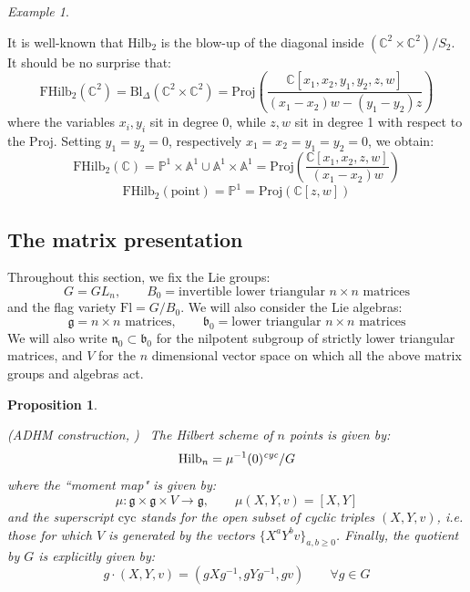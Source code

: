 \documentclass[12pt]{amsart}
\numberwithin{equation}{section}
\newtheorem{proposition}[theorem]{Proposition}
\theoremstyle{definition}
\theoremstyle{remark}
\newtheorem{example}[theorem]{Example}
\renewcommand{\AA}{\mathbb{A}}
\newcommand{\CC}{\mathbb{C}}
\newcommand{\PP}{\mathbb{P}}
\renewcommand{\1}{\mathbf{1}}
\newcommand{\cyc}{\text{cyc}}
\newcommand{\fl}{\text{Fl}}
\newcommand{\FH}{\mathrm{FHilb}}
\renewcommand{\H}{\mathrm{Hilb}}
\newcommand{\point}{\mathrm{point}}
\newcommand{\fg}{\mathfrak{g}}
\newcommand{\fb}{\mathfrak{b}}
\newcommand{\fn}{\mathfrak{n}}
\begin{document}
\begin{example}
\label{ex:hilb}

It is well-known that $\H_2$ is the blow-up of the diagonal inside $(\CC^2\times \CC^2)/S_2$. It should be no surprise that:
\begin{equation}
\label{eqn:c2}
\FH_2(\CC^2) = \text{Bl}_\Delta\left( \CC^2 \times \CC^2 \right) = \text{Proj} \left( \frac {\CC[x_1,x_2,y_1,y_2,z,w]}{(x_1-x_2)w - (y_1-y_2)z} \right)
\end{equation}
where the variables $x_i,y_i$ sit in degree 0, while $z,w$ sit in degree 1 with respect to the Proj. Setting $y_1=y_2=0$, respectively $x_1=x_2=y_1=y_2=0$, we obtain:
\begin{equation}
\label{eqn:c1}
\FH_2(\CC) = \PP^1 \times \AA^1 \cup \AA^1 \times \AA^1 = \text{Proj} \left( \frac {\CC[x_1,x_2,z,w]}{(x_1-x_2)w} \right)
\end{equation}
\begin{equation}
\label{eqn:c0}
\FH_2(\point) = \PP^1 = \text{Proj} \left( \CC[z,w]\right)
\end{equation}

\end{example}

\subsection{The matrix presentation}
\label{sub:adhm hilbert}

Throughout this section, we fix the Lie groups:
$$
G = GL_n, \qquad B_0 = \text{invertible lower triangular }n \times n\text{ matrices}
$$
and the flag variety $\fl = G/B_0$. We will also consider the Lie algebras:
$$
\fg = n\times n \text{ matrices}, \qquad \fb_0 = \text{lower triangular }n \times n\text{ matrices}
$$
We will also write $\fn_0 \subset \fb_0$ for the nilpotent subgroup of strictly lower triangular matrices, and $V$ for the $n$ dimensional vector space on which all the above matrix groups and algebras act. %

\begin{proposition} 
\label{prop:adhm}

(ADHM construction, \cite{Nak}) \ The Hilbert scheme of $n$ points is given by:
\begin{equation}
\label{eqn:defhilbert}
\H_n = \mu^{-1}(0)^{\emph{cyc}}/G
\end{equation}
where the ``moment map" is given by:
\begin{equation}
\label{eqn:defmoment}
\mu: \fg \times \fg \times V \longrightarrow \fg, \qquad \mu(X,Y,v) = [X,Y]
\end{equation}
and the superscript $\cyc$ stands for the open subset of cyclic triples $(X,Y,v)$, i.e. those for which $V$ is generated by the vectors $\{X^aY^bv\}_{a,b\geq 0}$. Finally, the quotient by $G$ is explicitly given by:
$$
g\cdot (X,Y,v) = \left( g X g^{-1},g Y g^{-1},g v \right) \qquad \forall g \in G
$$
\end{proposition}
\end{document}
